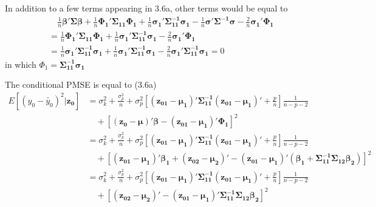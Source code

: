 \documentclass[11pt]{article}
\begin{document}
In addition to a few terms appearing in 3.6a, other terms would be equal to
$$\begin{aligned}
&\quad\frac{1}{n}\boldsymbol{\beta'\Sigma\beta}+\frac{1}{n}\boldsymbol{\Phi_1'\Sigma_{11}\Phi_1}+\frac{1}{n}\boldsymbol{\sigma_1'\Sigma_{11}^{-1}\sigma_1}-\frac{1}{n}\boldsymbol{\sigma'\Sigma^{-1}\sigma}-\frac{2}{n}\boldsymbol{\sigma_1'\Phi_1}\\
&=\frac{1}{n}\boldsymbol{\Phi_1'\Sigma_{11}\Phi_1}+\frac{1}{n}\boldsymbol{\sigma_1'\Sigma_{11}^{-1}\sigma_1}-\frac{2}{n}\boldsymbol{\sigma_1'\Phi_1}\\
&=\frac{1}{n}\boldsymbol{\sigma_1'\Sigma_{11}^{-1}\sigma_1}+\frac{1}{n}\boldsymbol{\sigma_1'\Sigma_{11}^{-1}\sigma_1}-\frac{2}{n}\boldsymbol{\sigma_1'\Sigma_{11}^{-1}\sigma_1}=0
\end{aligned}$$
in which $\Phi_1 = \boldsymbol{\Sigma_{11}^{-1}\sigma_1}$




The conditional PMSE is equal to (3.6a)
$$\begin{aligned}
E[(y_0-\tilde{y_0})^2|\boldsymbol{z_0}] &= \sigma_k^2+\frac{\sigma_p^2}{n}+\sigma_p^2\left[\boldsymbol{(z_{01}-\mu_1)'\Sigma_{11}^{-1}(z_{01}-\mu_1)'}+\frac{p}{n}\right]\frac{1}{n-p-2}\\
&\quad+[\boldsymbol{(z_0-\mu)'\beta-(z_{01}-\mu_1)'\Phi_1}]^2\\
&=\sigma_k^2+\frac{\sigma_p^2}{n}+\sigma_p^2\left[\boldsymbol{(z_{01}-\mu_1)'\Sigma_{11}^{-1}(z_{01}-\mu_1)'}+\frac{p}{n}\right]\frac{1}{n-p-2}\\
&\quad+[\boldsymbol{(z_{01}-\mu_1)'\beta_1+(z_{02}-\mu_2)'-(z_{01}-\mu_1)'(\beta_1+\Sigma_{11}^{-1}\Sigma_{12}\beta_2)}]^2\\
&=\sigma_k^2+\frac{\sigma_p^2}{n}+\sigma_p^2\left[\boldsymbol{(z_{01}-\mu_1)'\Sigma_{11}^{-1}(z_{01}-\mu_1)'}+\frac{p}{n}\right]\frac{1}{n-p-2}\\
&\quad+[\boldsymbol{(z_{02}-\mu_2)'-(z_{01}-\mu_1)'\Sigma_{11}^{-1}\Sigma_{12}\beta_2}]^2
\end{aligned}$$
\end{document}
